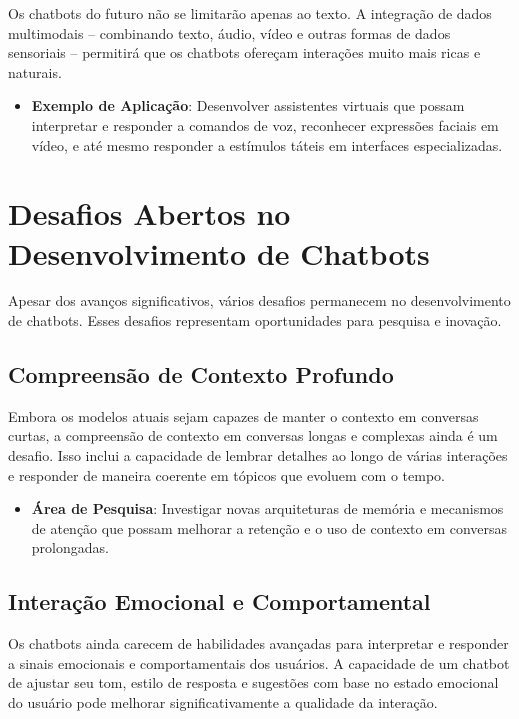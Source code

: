 \documentclass[14pt,a4paper,oneside]{book}
\begin{document}
Os chatbots do futuro não se limitarão apenas ao texto. A integração de dados multimodais – combinando texto, áudio, vídeo e outras formas de dados sensoriais – permitirá que os chatbots ofereçam interações muito mais ricas e naturais.

\begin{itemize}
	\item \textbf{Exemplo de Aplicação}: Desenvolver assistentes virtuais que possam interpretar e responder a comandos de voz, reconhecer expressões faciais em vídeo, e até mesmo responder a estímulos táteis em interfaces especializadas.
\end{itemize}

\section{Desafios Abertos no Desenvolvimento de Chatbots}

Apesar dos avanços significativos, vários desafios permanecem no desenvolvimento de chatbots. Esses desafios representam oportunidades para pesquisa e inovação.

\subsection{Compreensão de Contexto Profundo}

Embora os modelos atuais sejam capazes de manter o contexto em conversas curtas, a compreensão de contexto em conversas longas e complexas ainda é um desafio. Isso inclui a capacidade de lembrar detalhes ao longo de várias interações e responder de maneira coerente em tópicos que evoluem com o tempo.

\begin{itemize}
	\item \textbf{Área de Pesquisa}: Investigar novas arquiteturas de memória e mecanismos de atenção que possam melhorar a retenção e o uso de contexto em conversas prolongadas.
\end{itemize}

\subsection{Interação Emocional e Comportamental}

Os chatbots ainda carecem de habilidades avançadas para interpretar e responder a sinais emocionais e comportamentais dos usuários. A capacidade de um chatbot de ajustar seu tom, estilo de resposta e sugestões com base no estado emocional do usuário pode melhorar significativamente a qualidade da interação.
\end{document}
